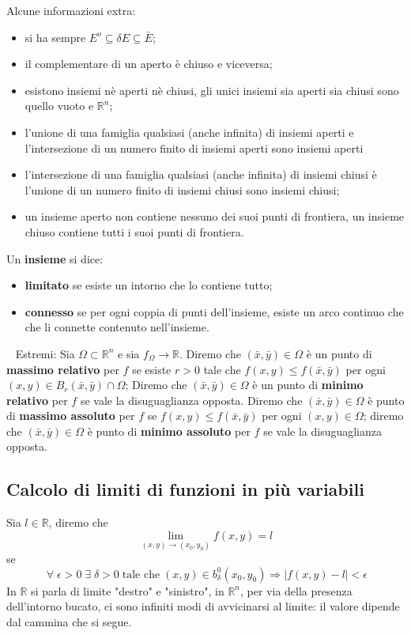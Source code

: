 Alcune informazioni extra: 
\begin{itemize}
    \item si ha sempre $E^o \subseteq \delta E \subseteq \bar{E}$;
    \item il complementare di un aperto è chiuso e viceversa; 
    \item esistono insiemi nè aperti nè chiusi, gli unici insiemi sia aperti sia chiusi sono quello vuoto e $\mathbb{R}^n$;
    \item l'unione di una famiglia qualsiasi (anche infinita) di insiemi aperti e l'intersezione di un numero finito di insiemi aperti sono insiemi aperti 
    \item l'intersezione di una famiglia qualsiasi (anche infinita) di insiemi chiusi è l'unione di un numero finito di insiemi chiusi sono insiemi chiusi;
    \item un insieme aperto non contiene nessuno dei suoi punti di frontiera, un insieme chiuso contiene tutti i suoi punti di frontiera.
\end{itemize}
Un \textbf{insieme} si dice:
\begin{itemize}
    \item \textbf{limitato} se esiste un intorno che lo contiene tutto;
    \item \textbf{connesso} se per ogni coppia di punti dell'insieme, esiste un arco continuo che che li connette contenuto nell'insieme.
\end{itemize}
\ \newline
Estremi:\newline
Sia $\Omega \subset \mathbb{R}^n$ e sia $f_\Omega \rightarrow \mathbb{R}$. Diremo che $(\bar{x}, \bar{y}) \in \Omega$ è un punto di \textbf{massimo relativo} per $f$ se esiste $r > 0$ tale che $f(x,y) \leq f(\bar{x},\bar{y})$ per ogni $(x,y) \in B_r(\bar{x},\bar{y}) \cap \Omega$; Diremo che $(\bar{x},\bar{y}) \in \Omega$ è un punto di \textbf{minimo relativo} per $f$ se vale la disuguaglianza opposta. Diremo che $(\bar{x},\bar{y}) \in \Omega$ è punto di \textbf{massimo assoluto} per $f$ se $f(x,y)\leq f(\bar{x},\bar{y})$ per ogni $(x,y) \in \Omega$; diremo che $(\bar{x},\bar{y}) \in \Omega$ è punto di \textbf{minimo assoluto} per $f$ se vale la disuguaglianza opposta.
\subsection{Calcolo di limiti di funzioni in più variabili}
Sia $l \in \mathbb{R}$, diremo che
\[
    \lim_{(x,y) \rightarrow (x_0,y_0)} f(x,y) = l
\]
se 
\[
    \;\forall\; \epsilon > 0 \; \exists \; \delta > 0 \; \text{tale che}\; (x,y) \in b_\delta^0 (x_0,y_0) \Rightarrow |f(x,y)-l| < \epsilon 
\]
In $\mathbb{R}$ si parla di limite "destro" e "sinistro", in $\mathbb{R}^n$, per via della presenza dell'intorno bucato, ci sono infiniti modi di avvicinarsi al limite: il valore dipende dal cammina che si segue.
